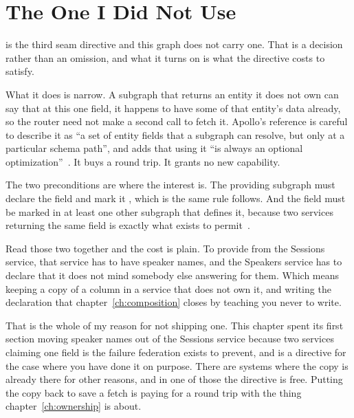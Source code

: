 \section{The One I Did Not Use}
\label{sec:ch09-the-one-i-did-not-use}

%
 is the third seam directive and this graph does not carry one.
That is a decision rather than an omission, and what it turns on is what the
directive costs to satisfy.

%
What it does is narrow. A subgraph that returns an entity it does not own can
say that at this one field, it happens to have some of that entity's data
already, so the router need not make a second call to fetch it. Apollo's
reference is careful to describe it as
\enquote{a set of entity fields that a subgraph can resolve, but only at a
particular schema path}, and adds that using it
\enquote{is always an optional optimization}~\autocite{apollodirectives}. It
buys a round trip. It grants no new capability.

%
The two preconditions are where the interest is. The providing subgraph must
declare the field and mark it , which is the same rule
 follows. And the field must be marked  in at
least one other subgraph that defines it, because two services returning the
same field is exactly what  exists to
permit~\autocite{apollodirectives}.

%
Read those two together and the cost is plain. To provide 
from the Sessions service, that service has to have speaker names, and the
Speakers service has to declare that it does not mind somebody else answering
for them. Which means keeping a copy of a column in a service that does not own
it, and writing the declaration that chapter~\ref{ch:composition} closes by
teaching you never to write.

%
That is the whole of my reason for not shipping one. This chapter spent its
first section moving speaker names out of the Sessions service because two
services claiming one field is the failure federation exists to prevent, and
 is a directive for the case where you have done it on purpose.
There are systems where the copy is already there for other reasons, and in
one of those the directive is free. Putting the copy back to save a fetch is
paying for a round trip with the thing chapter~\ref{ch:ownership} is about.

